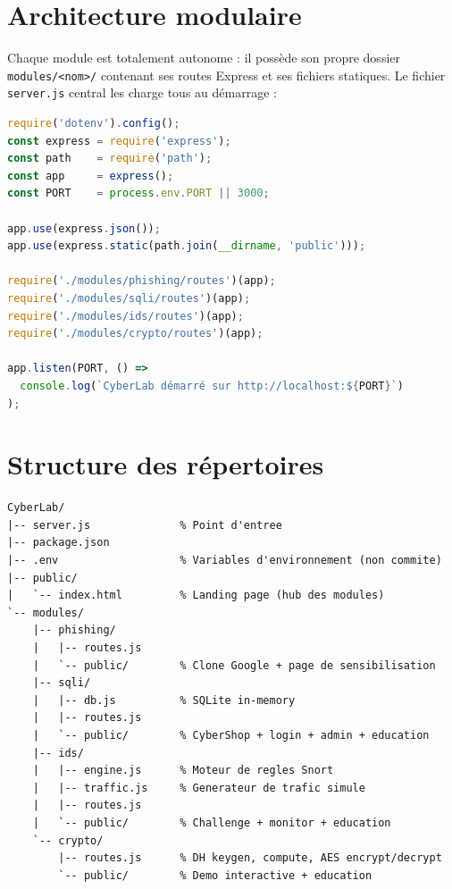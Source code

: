 \documentclass[12pt,a4paper]{report}
\newcommand{\code}[1]{\texttt{#1}}
\begin{document}
\section{Architecture modulaire}

Chaque module est totalement autonome : il possède son propre dossier
\code{modules/<nom>/} contenant ses routes Express et ses fichiers statiques.
Le fichier \code{server.js} central les charge tous au démarrage :

\begin{lstlisting}[language=JavaScript, caption={Point d'entrée — chargement de tous les modules}]
require('dotenv').config();
const express = require('express');
const path    = require('path');
const app     = express();
const PORT    = process.env.PORT || 3000;

app.use(express.json());
app.use(express.static(path.join(__dirname, 'public')));

require('./modules/phishing/routes')(app);
require('./modules/sqli/routes')(app);
require('./modules/ids/routes')(app);
require('./modules/crypto/routes')(app);

app.listen(PORT, () =>
  console.log(`CyberLab démarré sur http://localhost:${PORT}`)
);
\end{lstlisting}

\section{Structure des répertoires}

\begin{lstlisting}[numbers=none, caption={Arborescence complète du projet}]
CyberLab/
|-- server.js              % Point d'entree
|-- package.json
|-- .env                   % Variables d'environnement (non commite)
|-- public/
|   `-- index.html         % Landing page (hub des modules)
`-- modules/
    |-- phishing/
    |   |-- routes.js
    |   `-- public/        % Clone Google + page de sensibilisation
    |-- sqli/
    |   |-- db.js          % SQLite in-memory
    |   |-- routes.js
    |   `-- public/        % CyberShop + login + admin + education
    |-- ids/
    |   |-- engine.js      % Moteur de regles Snort
    |   |-- traffic.js     % Generateur de trafic simule
    |   |-- routes.js
    |   `-- public/        % Challenge + monitor + education
    `-- crypto/
        |-- routes.js      % DH keygen, compute, AES encrypt/decrypt
        `-- public/        % Demo interactive + education
\end{lstlisting}
\end{document}
